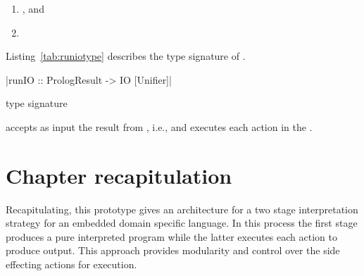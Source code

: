 \documentclass[thesis-solanki.tex]{subfiles}
\begin{document}
\begin{enumerate}
\item {}, and

\item {} 
\end{enumerate} 
 

Listing~\ref{tab:runiotype} describes the type signature of .
\begin{code-list}[H]
\begin{singlespace}
|runIO :: PrologResult -> IO [Unifier]| 
\end{singlespace}
\caption{ type signature}
\label{tab:runiotype}
\end{code-list}

 accepts as input the result from , i.e.,  and executes
each action in the .

\section{Chapter recapitulation}
Recapitulating, this prototype gives an architecture for a two stage interpretation strategy for an embedded domain specific language. In 
this process the first stage produces a pure interpreted program while the latter executes each action to produce output. This approach 
provides modularity and control over the side effecting actions for execution.   


\ifMain\ifDraft
\begin{scope}
  \nolinenumbers
  \enotesize
  \par
  \begin{singlespace}
  \setlength{\parskip}{12pt plus 2pt minus 1pt}
  \theendnotes
  \par
  \end{singlespace}
\end{scope}
\fi\fi
\end{document}
